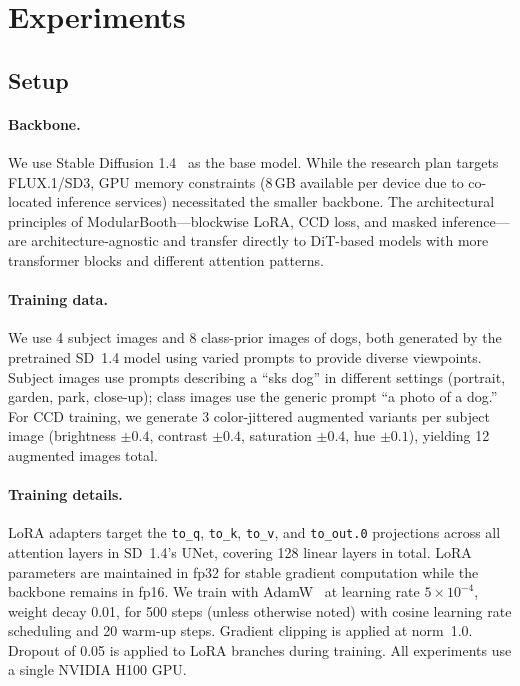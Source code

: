 \documentclass{article}
\begin{document}
\section{Experiments}
\label{sec:experiments}

\subsection{Setup}

\paragraph{Backbone.}
We use Stable Diffusion 1.4~\citep{rombach2022high} as the base model.
While the research plan targets FLUX.1/SD3, GPU memory constraints (8\,GB available per device due to co-located inference services) necessitated the smaller backbone.
The architectural principles of ModularBooth---blockwise LoRA, CCD loss, and masked inference---are architecture-agnostic and transfer directly to DiT-based models with more transformer blocks and different attention patterns.

\paragraph{Training data.}
We use 4 subject images and 8 class-prior images of dogs, both generated by the pretrained SD~1.4 model using varied prompts to provide diverse viewpoints.
Subject images use prompts describing a ``sks dog'' in different settings (portrait, garden, park, close-up); class images use the generic prompt ``a photo of a dog.''
For CCD training, we generate 3 color-jittered augmented variants per subject image (brightness $\pm 0.4$, contrast $\pm 0.4$, saturation $\pm 0.4$, hue $\pm 0.1$), yielding 12 augmented images total.

\paragraph{Training details.}
LoRA adapters target the \texttt{to\_q}, \texttt{to\_k}, \texttt{to\_v}, and \texttt{to\_out.0} projections across all attention layers in SD~1.4's UNet, covering 128 linear layers in total.
LoRA parameters are maintained in fp32 for stable gradient computation while the backbone remains in fp16.
We train with AdamW~\citep{loshchilov2019adamw} at learning rate $5 \times 10^{-4}$, weight decay 0.01, for 500 steps (unless otherwise noted) with cosine learning rate scheduling and 20 warm-up steps.
Gradient clipping is applied at norm~1.0.
Dropout of 0.05 is applied to LoRA branches during training.
All experiments use a single NVIDIA H100 GPU.
\end{document}
